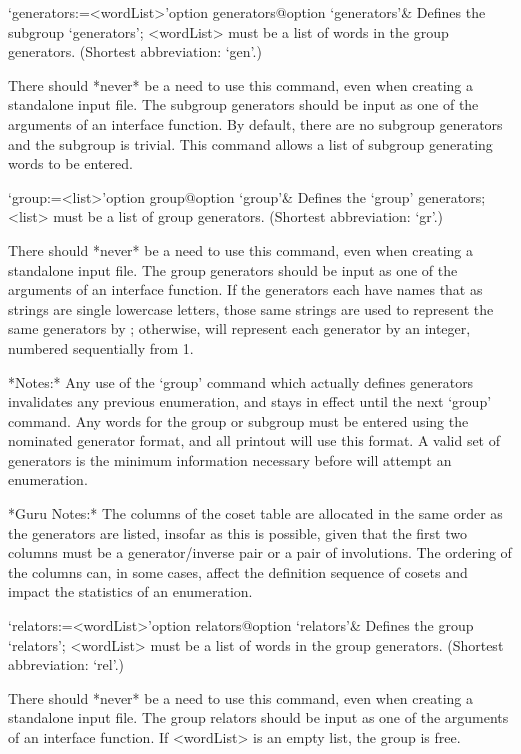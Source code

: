 \beginitems

\>`generators:=<wordList>'{option generators}@{option `generators'}&
Defines the subgroup `generators'; <wordList> must be a list of  words
in the group generators. (Shortest abbreviation: `gen'.)

There should *never* be a need to use this command, even when creating
a standalone input file. The subgroup generators should  be  input  as
one of the arguments of an  {\ACE}  interface  function.  By  default,
there are no subgroup generators and the  subgroup  is  trivial.  This
command allows a list of subgroup generating words to be entered.

\>`group:=<list>'{option group}@{option `group'}&
Defines the `group' generators; <list> must be a list of {\GAP}  group
generators. (Shortest abbreviation: `gr'.)

There should *never* be a need to use this command, even when creating
a standalone input file. The group generators should be input  as  one
of the arguments of an {\ACE} interface function.  If  the  generators
each have names that as strings are single  lowercase  letters,  those
same strings are used to represent  the  same  generators  by  {\ACE};
otherwise,  {\ACE}  will  represent  each  generator  by  an  integer,
numbered sequentially from 1.

*Notes:*
Any use of the  `group'  command  which  actually  defines  generators
invalidates any previous enumeration, and stays in  effect  until  the
next `group' command. Any words for the  group  or  subgroup  must  be
entered using the nominated generator format, and  all  printout  will
use this format. A valid set of generators is the minimum  information
necessary before {\ACE} will attempt an enumeration.

*Guru Notes:*
The columns of the coset table are allocated in the same order as  the
generators are listed, insofar as this is  possible,  given  that  the
first two columns must be  a  generator/inverse  pair  or  a  pair  of
involutions. The ordering of the columns can, in  some  cases,  affect
the definition sequence of cosets and  impact  the  statistics  of  an
enumeration.

\>`relators:=<wordList>'{option relators}@{option `relators'}&
Defines the group `relators'; <wordList> must be a list  of  words  in
the group generators. (Shortest abbreviation: `rel'.)

There should *never* be a need to use this command, even when creating
a standalone input file. The group relators should be input as one  of
the arguments of an {\ACE} interface function.  If  <wordList>  is  an
empty list, the group is free.

